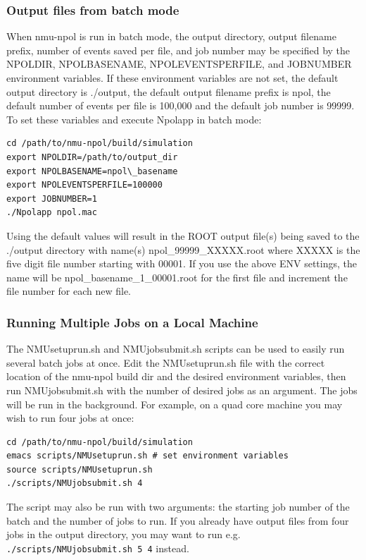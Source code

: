 \documentclass[10pt,titlepage]{article}
\begin{document}
\subsubsection{Output files from batch mode}
When nmu-npol is run in batch mode, the output directory, output filename prefix, number of events saved per file, and job number may be specified by the NPOLDIR, NPOLBASENAME, NPOLEVENTSPERFILE, and JOBNUMBER environment variables.  If these environment variables are not set, the default output directory is ./output, the default output filename prefix is npol, the default number of events per file is 100,000 and the default job number is 99999.  To set these variables and execute Npolapp in batch mode:
\begin{lstlisting}[frame=single]
cd /path/to/nmu-npol/build/simulation
export NPOLDIR=/path/to/output_dir
export NPOLBASENAME=npol\_basename
export NPOLEVENTSPERFILE=100000
export JOBNUMBER=1
./Npolapp npol.mac
\end{lstlisting}
Using the default values will result in the ROOT output file(s) being saved to the ./output directory with name(s) npol\_99999\_XXXXX.root where XXXXX is the five digit file number starting with 00001. If you use the above ENV settings, the name will be npol\_basename\_1\_00001.root for the first file and increment the file number for each new file.  \\

\subsubsection{Running Multiple Jobs on a Local Machine}
The NMUsetuprun.sh and NMUjobsubmit.sh scripts can be used to easily run several batch jobs at once.  Edit the NMUsetuprun.sh file with the correct location of the nmu-npol build dir and the desired environment variables, then run NMUjobsubmit.sh with the number of desired jobs as an argument.  The jobs will be run in the background.  For example, on a quad core machine you may wish to run four jobs at once:
\begin{lstlisting}[frame=single]
cd /path/to/nmu-npol/build/simulation
emacs scripts/NMUsetuprun.sh # set environment variables
source scripts/NMUsetuprun.sh
./scripts/NMUjobsubmit.sh 4
\end{lstlisting}
The script may also be run with two arguments: the starting job number of the batch and the number of jobs to run.  If you already have output files from four jobs in the output directory, you may want to run e.g. \texttt{./scripts/NMUjobsubmit.sh 5 4} instead.
\end{document}

